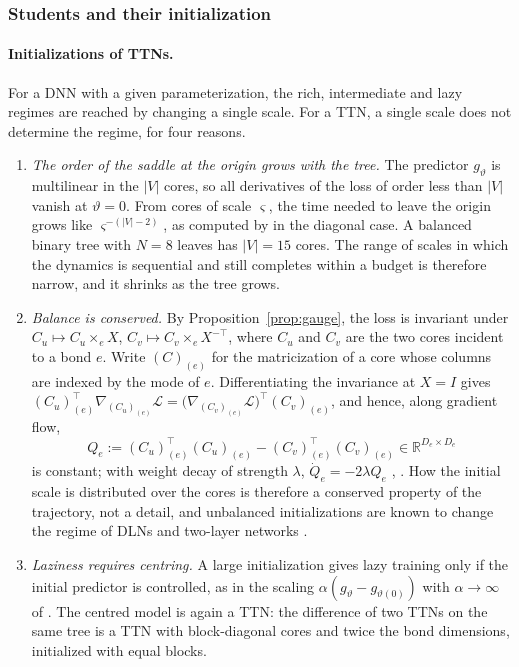 \documentclass[11pt]{article}
\newcommand{\R}{\mathbb{R}}
\theoremstyle{definition}
\numberwithin{equation}{section}
\begin{document}
\subsubsection{Students and their initialization}\label{sec:exp-students}

\paragraph{Initializations of TTNs.}
For a DNN with a given parameterization, the rich, intermediate and lazy regimes are reached by changing a single scale. For a TTN, a single scale does not determine the regime, for four reasons.
\begin{enumerate}[label=(\roman*),leftmargin=*]
\item \emph{The order of the saddle at the origin grows with the tree.} The predictor $g_\vartheta$ is multilinear in the $|V|$ cores, so all derivatives of the loss of order less than $|V|$ vanish at $\vartheta=0$. From cores of scale $\varsigma$, the time needed to leave the origin grows like $\varsigma^{-(|V|-2)}$, as computed by \citet[eq.~(4.7)]{hfl_diagonal} in the diagonal case. A balanced binary tree with $N=8$ leaves has $|V|=15$ cores. The range of scales in which the dynamics is sequential and still completes within a budget is therefore narrow, and it shrinks as the tree grows.
\item \emph{Balance is conserved.} By Proposition~\ref{prop:gauge}, the loss is invariant under $C_u\mapsto C_u\times_eX$, $C_v\mapsto C_v\times_eX^{-\top}$, where $C_u$ and $C_v$ are the two cores incident to a bond $e$. Write $(C)_{(e)}$ for the matricization of a core whose columns are indexed by the mode of $e$. Differentiating the invariance at $X=I$ gives $(C_u)_{(e)}^\top\nabla_{(C_u)_{(e)}}\mathcal L=\big(\nabla_{(C_v)_{(e)}}\mathcal L\big)^\top(C_v)_{(e)}$, and hence, along gradient flow,
\begin{equation}\label{eq:conserved}
Q_e:=(C_u)_{(e)}^\top(C_u)_{(e)}-(C_v)_{(e)}^\top(C_v)_{(e)}\in\R^{D_e\times D_e}
\end{equation}
is constant; with weight decay of strength $\lambda$, $\dot Q_e=-2\lambda Q_e$ \citep[cf.][]{du2018algorithmic}, \citep[Appendix~F]{furman2026benign}. How the initial scale is distributed over the cores is therefore a conserved property of the trajectory, not a detail, and unbalanced initializations are known to change the regime of DLNs and two-layer networks \citep{kunin2024get}.
\item \emph{Laziness requires centring.} A large initialization gives lazy training only if the initial predictor is controlled, as in the scaling $\alpha(g_\vartheta-g_{\vartheta(0)})$ with $\alpha\to\infty$ of \citet{chizat2019lazy}. The centred model is again a TTN: the difference of two TTNs on the same tree is a TTN with block-diagonal cores and twice the bond dimensions, initialized with equal blocks.

\end{enumerate}
\end{document}
